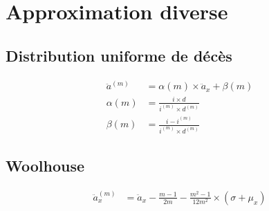 \chapter{Approximation diverse}

\section{Distribution uniforme de décès}
\begin{align*}
\ddot{a}^{(m)} &= \alpha(m) \times \ddot{a}_x + \beta(m) \\
\alpha(m) &= \frac{i \times d}{i^{(m)} \times d^{(m)}} \\
\beta(m) &= \frac{i - i^{(m)}}{i^{(m)} \times d^{(m)}}
\end{align*}

\section{Woolhouse}
\begin{align*}
\ddot{a}_x^{(m)} &= \ddot{a}_x - \frac{m -1}{2m}  - \frac{m^2 -1}{12 m^2}\times (\sigma + \mu_x)\\
\end{align*}